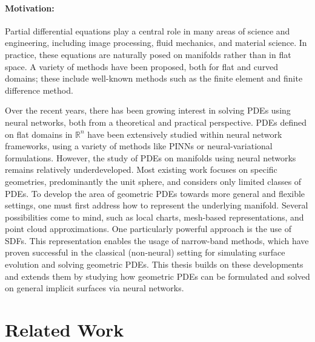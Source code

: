 \documentclass[12pt,openany]{book}
\newcommand{\R}{\mathbb{R}}
\theoremstyle{plainnormal}
\theoremstyle{remark}
\begin{document}
\paragraph{Motivation:} Partial differential equations play a central role in many areas of science and engineering, including image processing, fluid mechanics, and material science. In practice, these equations are naturally posed on manifolds rather than in flat space. A variety of methods have been proposed, both for flat and curved domains; these include well-known methods such as the finite element and finite difference method. \par
Over the recent years, there has been growing interest in solving PDEs using neural networks, both from a theoretical and practical perspective. PDEs defined on flat domains in $\R^n$ have been extensively studied within neural network frameworks, using a variety of methods like PINNs or neural-variational formulations. However, the study of PDEs on manifolds using neural networks remains relatively underdeveloped. Most existing work focuses on specific geometries, predominantly the unit sphere, and considers only limited classes of PDEs.
To develop the area of geometric PDEs towards more general and flexible settings, one must first address how to represent the underlying manifold. Several possibilities come to mind, such as local charts, mesh-based representations, and point cloud approximations. One particularly powerful approach is the use of SDFs. This representation enables the usage of narrow-band methods, which have proven successful in the classical (non-neural) setting for simulating surface evolution and solving geometric PDEs.
This thesis builds on these developments and extends them by studying how geometric PDEs can be formulated and solved on general implicit surfaces via neural networks.
\section{Related Work}
\end{document}
